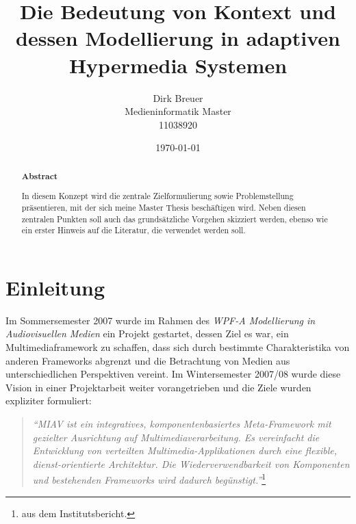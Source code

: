 \documentclass[12pt,headsepline,a4paper,bibtotoc,liststotoc,DIV12,BCOR12mm]{scrartcl}
\title{Die Bedeutung von Kontext und dessen Modellierung in adaptiven Hypermedia Systemen}
\author{Dirk Breuer\\Medieninformatik Master\\11038920}
\date{\today}
\begin{document}
  
\dosecttoc

\ifpdf
{}
\else
{}
\fi

\maketitle


\newpage

\begin{abstract}
  \begin{center}
    \textbf{Abstract\\}
    \vspace{.3cm}
  \end{center}
  In diesem Konzept wird die zentrale Zielformulierung sowie Problemstellung präsentieren, mit der sich meine Master Thesis beschäftigen wird. Neben diesen zentralen Punkten soll auch das grundsätzliche Vorgehen skizziert werden, ebenso wie ein erster Hinweis auf die Literatur, die verwendet werden soll.
  
\end{abstract}

\newpage
\tableofcontents
\newpage

\section{Einleitung} %
\label{sec:einleitung}

  Im Sommersemester 2007 wurde im Rahmen des \emph{WPF-A Modellierung in Audiovisuellen Medien} ein Projekt gestartet, dessen Ziel es war, ein Multimediaframework zu schaffen, dass sich durch bestimmte Charakteristika von anderen Frameworks abgrenzt und die Betrachtung von Medien aus unterschiedlichen Perspektiven vereint. Im Wintersemester 2007/08 wurde diese Vision in einer Projektarbeit weiter vorangetrieben und die Ziele wurden expliziter formuliert:
  
  \begin{quote}
    \emph{"`MIAV ist ein integratives, komponentenbasiertes Meta-Framework mit gezielter Ausrichtung auf Multimediaverarbeitung. Es vereinfacht die Entwicklung von verteilten Multimedia-Applikationen durch eine flexible, dienst-orientierte Architektur. Die Wiederverwendbarkeit von Komponenten und bestehenden Frameworks wird dadurch begünstigt."'}\footnote{aus dem Institutsbericht.}
  \end{quote}
  
\end{document}
